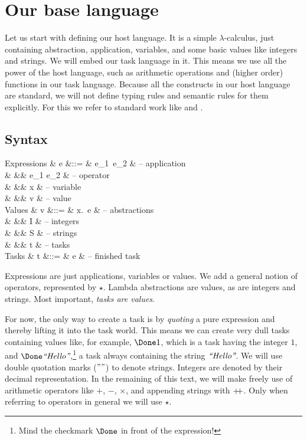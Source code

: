 
\section{Our base language}

Let us start with defining our host language.
It is a simple $\lambda$-calculus,
just containing abstraction, application, variables,
and some basic values like integers and strings.
We will embed our task language in it.
This means we use all the power of the host language,
such as arithmetic operations and (higher order) functions in our task language.
Because all the constructs in our host language are standard,
we will not define typing rules and semantic rules for them explicitly.
For this we refer to standard work like \textcite{pierce2002types} and \textcite{harper2016practical}.


\subsection{Syntax}

\begin{grammar}
  Expressions
    & e &::= & e_1\ e_2       & – application \\
    &   &\mid& e_1 \star e_2  & – operator \\
    &   &\mid& x              & – variable \\
    &   &\mid& v              & – value \\
  Values
    & v &::= & \lambda x.\ e  & – abstractions \\
    &   &\mid& I              & – integers \\
    &   &\mid& S              & – strings \\
    &   &\mid& t              & – tasks \\
  Tasks
    & t &::= & \Done e        & – finished task \\
\end{grammar}
Expressions are just applications, variables or values.
We add a general notion of operators, represented by $\star$.
Lambda abstractions are values, as are integers and strings.
Most important, \emph{tasks are values}.

For now, the only way to create a task is by \emph{quoting} a pure expression
and thereby lifting it into the task world.
This means we can create very dull tasks containing values like, for example, $\Done 1$,
which is a task having the integer $1$,
and $\Done \astring{Hello}$,\footnote{
  Mind the checkmark $\Done$ in front of the expression!
}
a task always containing the string $\textit{``Hello''}$.
We will use double quotation marks ($""$) to denote strings.
Integers are denoted by their decimal representation.
In the remaining of this text,
we will make freely use of arithmetic operators like $+$, $-$, $\times$,
and appending strings with $+\!\!+$.
Only when referring to operators in general we will use $\star$.


